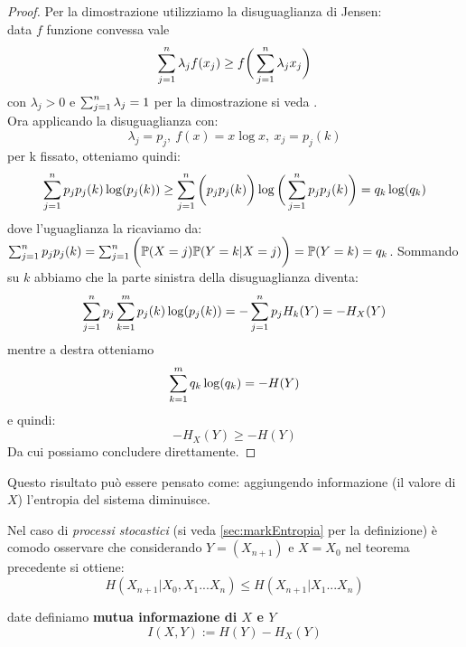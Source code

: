 \begin{proof}
Per la dimostrazione utilizziamo la disuguaglianza di Jensen:\\
data $f$ funzione convessa vale
\begin{equation}
\sum_{j=1}^n \lambda_j f(x_j)\geq f\bigg( \sum_{j=1}^n \lambda_j x_j \bigg)
\end{equation}
con $\lambda_j > 0$ e $\sum_{j=1}^n \lambda_j =1$
per la dimostrazione si veda \cite{Jensen}.\\
Ora applicando la disuguaglianza con:
$$\lambda_j=p_j,\ f(x)=x \log x, \  x_j=p_j(k)$$
per k fissato, otteniamo quindi:
$$\sum_{j=1}^n p_j p_j(k)\log (p_j(k))\geq \sum_{j=1}^n \bigg( p_j p_j(k) \bigg) \log \bigg( \sum_{j=1}^n p_j p_j(k) \bigg)=q_k \log (q_k)$$
dove l'uguaglianza la ricaviamo da: $\sum_{j=1}^n p_j p_j(k)=\sum_{j=1}^n \bigg( \mathbb{P}(X=j) \mathbb{P}(Y=k|X=j) \bigg)= \mathbb{P}(Y=k)= q_k$.
Sommando su $k$ abbiamo che la parte sinistra della disuguaglianza diventa:
$$\sum_{j=1}^n  p_j \sum_{k=1}^m p_j(k) \log (p_j(k))=-\sum_{j=1}^n p_j H_k(Y)=-H_X(Y)$$
mentre a destra otteniamo
$$\sum_{k=1}^m q_k \log (q_k)= -H(Y)$$
e quindi:
\begin{equation}
-H_X(Y) \geq -H(Y)
\end{equation}
Da cui possiamo concludere direttamente.
\end{proof}
Questo risultato può essere pensato come: aggiungendo informazione (il valore di $X$) l'entropia del sistema diminuisce.
\begin{oss}\label{oss:disugShannon}
Nel caso di \textit{processi stocastici} (si veda \ref{sec:markEntropia} per la definizione) è comodo osservare che considerando $Y=(X_{n+1})$ e $X=X_0$ nel teorema precedente si ottiene:
$$H(X_{n+1}|X_0,X_1...X_n) \leq H(X_{n+1}|X_1...X_n)$$
\end{oss}
\begin{defi}
date \var definiamo \textbf{mutua informazione di $X$ e $Y$}
\begin{equation} \label{defi:mutua}
I(X,Y):=H(Y)-H_X(Y)
\end{equation}
\end{defi}

